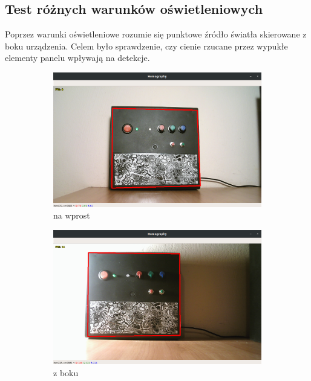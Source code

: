 \documentclass[12pt,twoside,polish]{article}
\begin{document}
\subsection{Test różnych warunków oświetleniowych}
Poprzez warunki oświetleniowe rozumie się punktowe źródło światła skierowane z boku urządzenia. Celem było sprawdzenie, czy cienie rzucane przez wypukłe elementy panelu wpływają na detekcje.
\begin{figure}[htb!]
	\begin{subfigure}{0.46\textwidth}
		\includegraphics[width=\textwidth]{test_light1}
		\caption{na wprost}
		\label{test_light1}
	\end{subfigure}
	\begin{subfigure}{0.46\textwidth}
		\includegraphics[width=\textwidth]{test_light2}
		\caption{z boku}
		\label{test_light2}
	\end{subfigure}
	\begin{subfigure}{0.46\textwidth}

\end{subfigure}
\end{figure}
\end{document}
